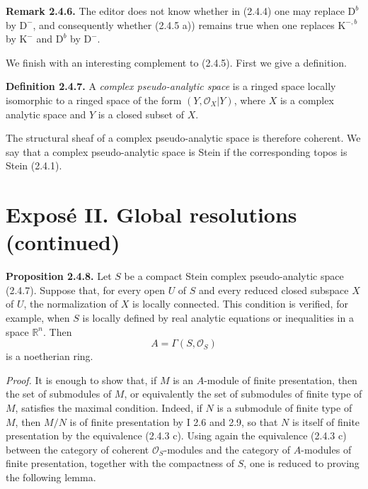 \textbf{Remark 2.4.6.} The editor does not know whether in (2.4.4) one may replace $\mathrm D^b$ by $\mathrm D^{-}$, and consequently whether (2.4.5 a)) remains true when one replaces $\mathrm K^{-,b}$ by $\mathrm K^{-}$ and $\mathrm D^b$ by $\mathrm D^{-}$.

We finish with an interesting complement to (2.4.5). First we give a definition.

\textbf{Definition 2.4.7.} A \emph{complex pseudo-analytic space} is a ringed space locally isomorphic to a ringed space of the form $(Y,\mathcal O_X|Y)$, where $X$ is a complex analytic space and $Y$ is a closed subset of $X$.

The structural sheaf of a complex pseudo-analytic space is therefore coherent. We say that a complex pseudo-analytic space is Stein if the corresponding topos is Stein (2.4.1).



\providecommand{\Qcoh}{\operatorname{Qcoh}}
\providecommand{\Mod}{\operatorname{Mod}}
\providecommand{\Coh}{\operatorname{Coh}}
\providecommand{\Ob}{\operatorname{Ob}}
\providecommand{\Hom}{\operatorname{Hom}}
\providecommand{\Ext}{\operatorname{Ext}}
\providecommand{\Spec}{\operatorname{Spec}}
\providecommand{\qcoh}{\mathrm{qcoh}}
\providecommand{\parf}{\mathrm{parf}}
\providecommand{\coh}{\mathrm{coh}}
\providecommand{\Loclib}{\operatorname{Loclib}}
\providecommand{\Lib}{\operatorname{Lib}}
\providecommand{\im}{\operatorname{Im}}

\section*{Exposé II. Global resolutions (continued)}

\textbf{Proposition 2.4.8.} Let $S$ be a compact Stein complex pseudo-analytic space (2.4.7). Suppose that, for every open $U$ of $S$ and every reduced closed subspace $X$ of $U$, the normalization of $X$ is locally connected. This condition is verified, for example, when $S$ is locally defined by real analytic equations or inequalities in a space $\mathbb R^n$. Then
\[
 A=\Gamma(S,\mathcal O_S)
\]
is a noetherian ring.

\emph{Proof.} It is enough to show that, if $M$ is an $A$-module of finite presentation, then the set of submodules of $M$, or equivalently the set of submodules of finite type of $M$, satisfies the maximal condition. Indeed, if $N$ is a submodule of finite type of $M$, then $M/N$ is of finite presentation by I 2.6 and 2.9, so that $N$ is itself of finite presentation by the equivalence (2.4.3 c). Using again the equivalence (2.4.3 c) between the category of coherent $\mathcal O_S$-modules and the category of $A$-modules of finite presentation, together with the compactness of $S$, one is reduced to proving the following lemma.

